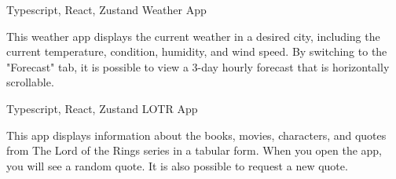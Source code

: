 

\begin{cventries}

  \cventry
  {Typescript, React, Zustand}
  {Weather App} %
  {} %
  {} %
  {
    \begin{cvitems} %
      \item {This weather app displays the current weather in a desired city, including the current temperature, condition, humidity, 
      and wind speed. By switching to the "Forecast" tab, 
      it is possible to view a 3-day hourly forecast that is horizontally scrollable.}
    \end{cvitems}
  }


  \cventry
  {Typescript, React, Zustand}
  {LOTR App}
  {} %
  {} %
  { \begin{cvitems} %
    \item {This app displays information about the books, movies, characters, and quotes from 
    The Lord of the Rings series in a tabular form. When you open the app, you will see a random quote. 
    It is also possible to request a new quote.}
  \end{cvitems}}
\end{cventries}
